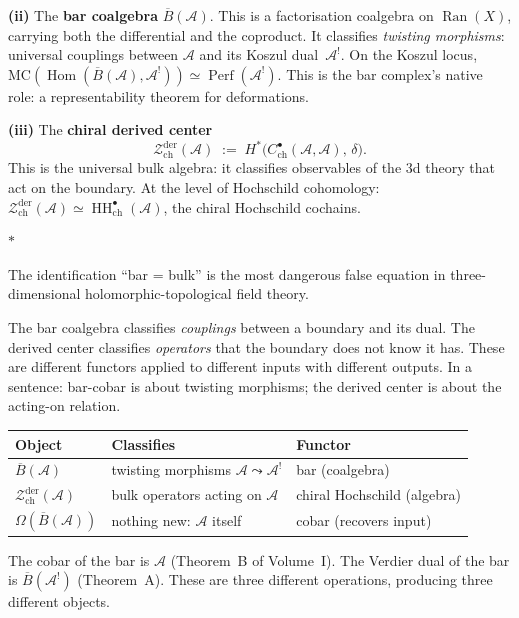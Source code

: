 \documentclass[11pt]{article}
\newcommand{\cA}{\mathcal{A}}
\newcommand{\cZ}{\mathcal{Z}}
\newcommand{\barB}{\overline{B}}
\newcommand{\Ran}{\operatorname{Ran}}
\newcommand{\MC}{\mathrm{MC}}
\newcommand{\Hom}{\operatorname{Hom}}
\newcommand{\HH}{\operatorname{HH}}
\newcommand{\Perf}{\operatorname{Perf}}
\newcommand{\Zder}{\cZ^{\mathrm{der}}_{\mathrm{ch}}}
\newcommand{\sep}{\bigskip\begin{center}$*$\end{center}\medskip}
\begin{document}
\medskip

\noindent
\textbf{(ii)} The \textbf{bar coalgebra} $\barB(\cA)$.  This is a
factorisation coalgebra on $\Ran(X)$, carrying both the
differential and the coproduct.  It classifies \textit{twisting
morphisms}: universal couplings between $\cA$ and its Koszul
dual~$\cA^!$.  On the Koszul locus,
$\MC(\Hom(\barB(\cA), \cA^!)) \simeq \Perf(\cA^!)$.  This is
the bar complex's native role: a representability theorem for
deformations.

\medskip

\noindent
\textbf{(iii)} The \textbf{chiral derived center}
\[
\Zder(\cA)
\;:=\;
H^*\bigl(C^\bullet_{\mathrm{ch}}(\cA, \cA),\, \delta\bigr).
\]
This is the universal bulk algebra: it classifies observables
of the $3$d theory that act on the boundary.  At the level of
Hochschild cohomology:
$\Zder(\cA) \simeq \HH^\bullet_{\mathrm{ch}}(\cA)$, the chiral
Hochschild cochains.

\sep

The identification ``bar = bulk'' is the most dangerous false
equation in three-dimensional holomorphic-topological field theory.

The bar coalgebra classifies \textit{couplings} between a boundary
and its dual.  The derived center classifies \textit{operators} that
the boundary does not know it has.  These are different functors
applied to different inputs with different outputs.  In a
sentence: bar-cobar is about twisting morphisms; the derived
center is about the acting-on relation.

\begin{center}
\small
\begin{tabular}{@{}lll@{}}
\textbf{Object} & \textbf{Classifies} & \textbf{Functor} \\
\hline
$\barB(\cA)$ & twisting morphisms $\cA \leadsto \cA^!$
  & bar (coalgebra) \\[3pt]
$\Zder(\cA)$ & bulk operators acting on $\cA$
  & chiral Hochschild (algebra) \\[3pt]
$\Omega(\barB(\cA))$ & nothing new: $\cA$ itself
  & cobar (recovers input)
\end{tabular}
\end{center}

\medskip

The cobar of the bar is $\cA$ (Theorem~B of Volume~I).  The
Verdier dual of the bar is $\barB(\cA^!)$ (Theorem~A).  These
are three different operations, producing three different
objects.


\end{document}
